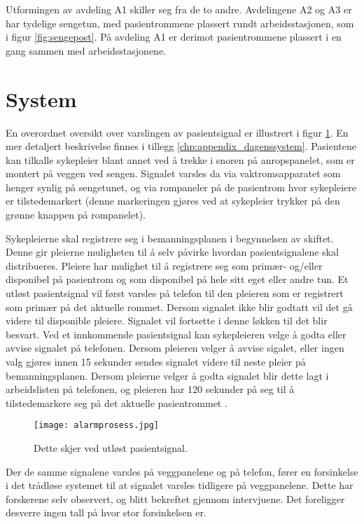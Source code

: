 \noindent
Utformingen av avdeling A1 skiller seg fra de to andre.
Avdelingene A2 og A3 er har tydelige sengetun, med pasientrommene plassert rundt arbeidsstasjonen, som i figur \ref{fig:sengepost}. På avdeling A1 er derimot pasientrommene plassert i en gang sammen med arbeidsstasjonene. 

\section{System}
En overordnet oversikt over varslingen av pasientsignal er illustrert i figur \ref{fig:detteskjer}. En mer detaljert beskrivelse finnes i tillegg \ref{chp:appendix_dagenssystem}.
Pasientene kan tilkalle sykepleier blant annet ved å trekke i snoren på anropspanelet, som er montert på veggen ved sengen. Signalet varsles da via vaktromsapparatet som henger synlig på sengetunet, og via rompaneler på de pasientrom hvor sykepleiere er tilstedemarkert (denne markeringen gjøres ved at sykepleier trykker på den grønne knappen på rompanelet). 

\noindent
Sykepleierne skal registrere seg i bemanningsplanen i begynnelsen av skiftet. Denne gir pleierne muligheten til å selv påvirke hvordan pasientsignalene skal distribueres. Pleiere har mulighet til å registrere seg som primær- og/eller disponibel på pasientrom og som disponibel på hele sitt eget eller andre tun. Et utløst pasientsignal vil først varsles på telefon til den pleieren som er registrert som primær på det aktuelle rommet. Dersom signalet ikke blir godtatt vil det gå videre til disponible pleiere. Signalet vil fortsette i denne løkken til det blir besvart.
Ved et innkommende pasientsignal kan sykepleieren velge å godta eller avvise signalet på telefonen. Dersom pleieren velger å avvise sigalet, eller ingen valg gjøres innen 15 sekunder sendes signalet videre til neste pleier på bemanningsplanen. Dersom pleierne velger å godta signalet blir dette lagt i arbeidslisten på telefonen, og pleieren har 120 sekunder på seg til å tilstedemarkere seg på det aktuelle pasientrommet \citep{BrukermanualforPasientsignalogPasientsignalapplikasjon}.

\begin{figure}[H]
\centering
\texttt{[image: alarmprosess.jpg]}
\caption{Dette skjer ved utløst pasientsignal.}
\label{fig:detteskjer}
\end{figure}

\noindent
Der de samme signalene varsles på veggpanelene og på telefon, fører en forsinkelse i det trådløse systemet til at signalet varsles tidligere på veggpanelene. Dette har forskerene selv observert, og blitt bekreftet gjennom intervjuene. Det foreligger desverre ingen tall på hvor stor forsinkelsen er. 

